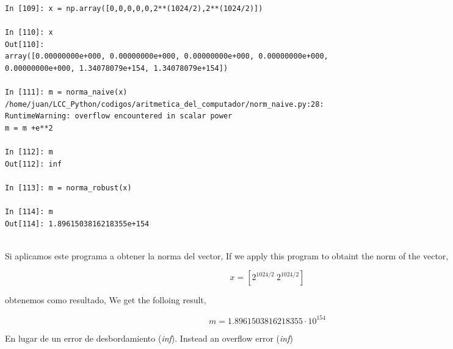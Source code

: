 \begin{center}
	\begin{minipage}{\textwidth}
		\begin{verbatim}
In [109]: x = np.array([0,0,0,0,0,2**(1024/2),2**(1024/2)])

In [110]: x
Out[110]: 
array([0.00000000e+000, 0.00000000e+000, 0.00000000e+000, 0.00000000e+000,
0.00000000e+000, 1.34078079e+154, 1.34078079e+154])

In [111]: m = norma_naive(x)
/home/juan/LCC_Python/codigos/aritmetica_del_computador/norm_naive.py:28:
RuntimeWarning: overflow encountered in scalar power
m = m +e**2

In [112]: m
Out[112]: inf

In [113]: m = norma_robust(x)

In [114]: m
Out[114]: 1.8961503816218355e+154
	    
\end{verbatim}
\end{minipage}
\end{center}
\begin{paracol}{2}
Si aplicamos este programa a obtener la norma del vector,
\switchcolumn
If we apply this program to obtaint the norm of the vector,
\end{paracol}
\begin{equation*}
x=[2^{1024/2}\ 2^{1024/2}]
\end{equation*}
\begin{paracol}{2}
obtenemos como resultado,
\switchcolumn
We get the folloing result,
\end{paracol}
\begin{equation*}
m=1.8961503816218355\cdot10^{154}
\end{equation*}
\begin{paracol}{2}
En lugar de un error de desbordamiento (\emph{inf}).
\switchcolumn
Instead an overflow error (\emph{inf}) 
\end{paracol}


  	 